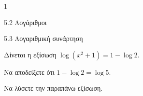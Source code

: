 \begin{ylh}{1}
\item 5.2 Λογάριθμοι
\item 5.3 Λογαριθμική συνάρτηση
\end{ylh}
Δίνεται η εξίσωση $\log(x^2 + 1) = 1 - \log 2$.
\begin{alist}
\item Να αποδείξετε ότι $1 - \log 2 = \log 5$.
\item Να λύσετε την παραπάνω εξίσωση.
\end{alist}

